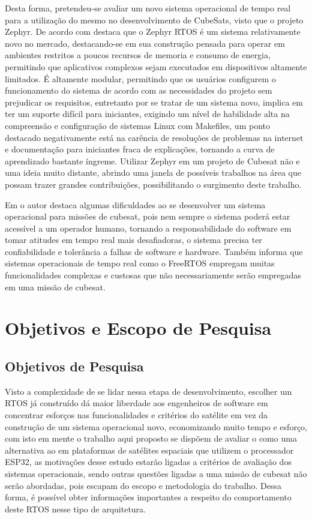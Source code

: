 Desta forma, pretendeu-se avaliar um novo sistema operacional de tempo real para a utilização do mesmo no 
desenvolvimento de CubeSats, visto que o projeto Zephyr. De acordo com \cite{nyffenegger2020connecting}destaca 
que o Zephyr RTOS é um sistema relativamente novo no mercado, destacando-se em sua construção pensada para operar 
em ambientes restritos a poucos recursos de memoria e consumo de energia, permitindo que aplicativos complexos 
sejam executados em dispositivos altamente limitados. É altamente modular, permitindo que os usuários configurem 
o funcionamento do sistema de acordo com as necessidades do projeto sem prejudicar os requisitos, entretanto 
por se tratar de um sistema novo, implica em ter um suporte difícil para iniciantes, exigindo um nível de 
habilidade alta na compreensão e configuração de sistemas Linux com Makefiles, um ponto destacado negativamente 
está na carência de resoluções de problemas na internet e documentação para iniciantes fraca de explicações, 
tornando a curva de aprendizado bastante íngreme. Utilizar Zephyr em um projeto de Cubesat não 
e uma ideia muito distante, abrindo uma janela de possíveis trabalhos na área que possam 
trazer grandes contribuições, possibilitando o surgimento deste trabalho.


Em \cite{Slacka} o autor destaca algumas dificuldades ao se desenvolver um sistema operacional para missões de 
cubesat, pois nem sempre o sistema poderá estar acessível a um operador humano, tornando a responsabilidade do 
software em tomar atitudes em tempo real mais desafiadoras, o sistema precisa ter confiabilidade e tolerância a 
falhas de software e hardware. Também informa que sistemas operacionais de tempo real como o 
FreeRTOS empregam muitas funcionalidades complexas e custosas que não necessariamente serão empregadas em uma 
missão de cubesat.


\section{Objetivos e Escopo de Pesquisa}
\subsection{Objetivos de Pesquisa}
Visto a complexidade de se lidar nessa etapa de desenvolvimento, escolher um RTOS já construído dá maior 
liberdade aos engenheiros de software em concentrar esforços nas funcionalidades e critérios do satélite em vez 
da construção de um sistema operacional novo, economizando muito tempo e esforço, com isto em mente o trabalho 
aqui proposto se dispõem de avaliar o \cite{Zephyr} como uma alternativa ao \cite{FreeRTOS} em plataformas de 
satélites espaciais que utilizem o processador ESP32, as motivações desse estudo estarão ligadas a critérios 
de avaliação dos sistemas operacionais, sendo outras questões ligadas a uma missão de cubesat não serão 
abordadas, pois escapam do escopo e metodologia do trabalho. Dessa forma, é possível obter informações importantes 
a respeito do comportamento deste RTOS nesse tipo de arquitetura.

